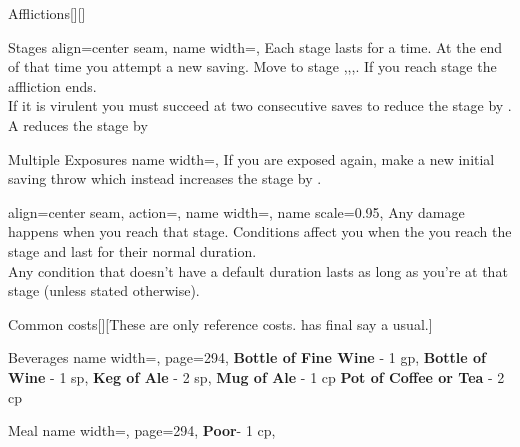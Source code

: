 \begin{PageBackLandscape}
\begin{TablesHalf}{\backTableHeight}
\begin{Table}{Afflictions}[][]
\begin{entry}{Stages}{%
                align=center seam,
                name width=\turnLength,}
                Each stage lasts for a time. At the end of that time you attempt a new saving.
                Move to stage ,,,.
                If you reach stage  the affliction ends.\\
                If it is virulent you must succeed at two consecutive saves to reduce the stage by .
                A  reduces the stage by 
            \end{entry}
            \begin{entry}{Multiple Exposures}{%
                name width=\turnLength,}
                If you are exposed again, make a new initial saving throw which instead
                increases the stage by  .
            \end{entry}
            \begin{entry}{}{%
                align=center seam,
                action={\BodyFont{}},
                name width=\turnLength,%
                name scale=0.95,
            }
                Any damage happens when you reach that stage.
                Conditions affect you when the you reach the stage and last for their normal duration.\\
                Any condition that doesn't have a default duration lasts as long as you're at that stage (unless stated otherwise).
            \end{entry}
        \end{Table}\TableSpace
        \begin{Table}{Common costs}[][These are only reference costs. \GM has final say a usual.]
            \begin{entry}{Beverages }{%
                name width=\turnLength,%
                page=294,
            }
                \textbf{Bottle of Fine Wine} - 1 gp, \quad
                \textbf{Bottle of Wine} - 1 sp, \quad
                \textbf{Keg of Ale} - 2 sp, \quad
                \textbf{Mug of Ale} - 1 cp \quad
                \textbf{Pot of Coffee or Tea} - 2 cp\quad
            \end{entry}
            \begin{entry}{Meal}{%
                name width=\turnLength,%
                page=294,
            }
                \textbf{Poor}- 1 cp, \quad

\end{entry}
\end{Table}
\end{TablesHalf}
\end{PageBackLandscape}
